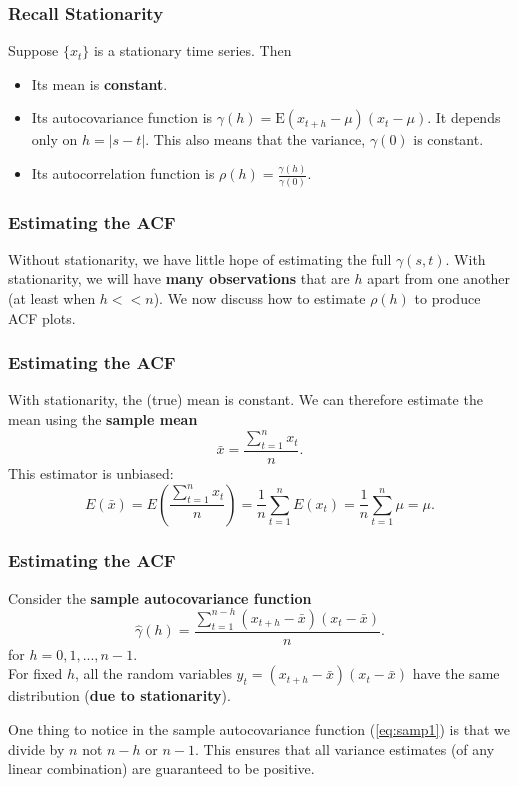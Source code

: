 \documentclass[%
xcolor=pdftex]{beamer}
\begin{document}
\begin{frame}
\frametitle{Recall Stationarity}

Suppose $\{x_t\}$ is a stationary time series. Then

\begin{itemize}
\item Its mean is \textbf{constant}.
\item Its autocovariance function is $\gamma(h)=\mbox{E}(x_{t+h}-\mu)(x_t-\mu)$. It depends only on $h=|s-t|$. This also means that the variance, $\gamma(0)$ is constant.
\item Its autocorrelation function is $\rho(h) =\frac{\gamma(h)}{\gamma(0)}$.
\end{itemize}

\end{frame}

\begin{frame}
\frametitle{Estimating the ACF}

Without stationarity, we have little
hope of estimating the full $\gamma(s,t)$.  With stationarity,
we will have \textbf{many observations} that are $h$ apart from one
another (at least when $h<<n$).  We now discuss how to
estimate $\rho(h)$ to produce ACF plots.

\end{frame}

\begin{frame}
\frametitle{Estimating the ACF}

With stationarity, the (true) mean is constant.  We can therefore estimate the mean using the \textbf{sample mean}
$$
\bar{x}=\frac{\sum_{t=1}^n x_t}{n}.
$$
This estimator is unbiased:
$$
E(\bar{x}) = E \left(\frac{\sum^n_{t=1}x_t}{n} \right) = \frac{1}{n} \sum^n_{t=1} E(x_t)  =\frac{1}{n} \sum^n_{t=1} \mu =\mu.
$$
\end{frame}

\begin{frame}
\frametitle{Estimating the ACF}

Consider the \textbf{sample autocovariance function}
\begin{equation} \label{eq:samp1}
\hat{\gamma}(h)=\frac{\sum_{t=1}^{n-h} (x_{t+h}-\bar{x})(x_{t}-\bar{x})}{n}.
\end{equation}
for $h=0,1,...,n-1$.  \\
\vspace{5mm}
For fixed $h$, all the random variables $y_t=(x_{t+h}-\bar{x})(x_{t}-\bar{x})$ have the same distribution (\textbf{due to stationarity}).  
\newline

One thing to notice in the sample autocovariance function (\ref{eq:samp1}) is that we divide by $n$ not $n-h$ or $n-1$. This ensures that all variance estimates (of any linear combination) are guaranteed to be positive.



\end{frame}
\end{document}
